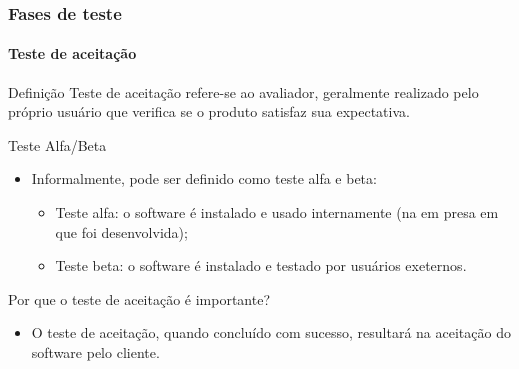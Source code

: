 \begin{frame}[hasprev=true, hasnext=false]
\label{concept:acceptance-testing}
\frametitle{Fases de teste}
\framesubtitle{Teste de aceitação}

\begin{block:concept}{Definição}
Teste de aceitação refere-se ao avaliador, geralmente realizado pelo próprio usuário que verifica se o produto satisfaz sua expectativa.
\end{block:concept}

\begin{block:fact}{Teste Alfa/Beta}
\begin{itemize}
	\item Informalmente, pode ser definido como teste alfa e beta:
	\begin{itemize}
		\item Teste alfa: o software é instalado e usado internamente (na em presa em que foi desenvolvida);

		\item Teste beta: o software é instalado e testado por usuários exeternos.
	\end{itemize}
\end{itemize}
\end{block:fact}

\begin{block:fact}{Por que o teste de aceitação é importante?}
\begin{itemize}
    \item O teste de aceitação, quando concluído com sucesso, resultará na aceitação do software pelo cliente.
\end{itemize}
\end{block:fact}
\end{frame}
